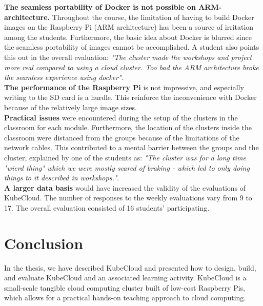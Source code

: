 \noindent
\textbf{The seamless portability of Docker is not possible on ARM-architecture.} Throughout the course, the limitation of having to build Docker images on the Raspberry Pi (ARM architecture) has been a source of irritation among the students. Furthermore, the basic idea about Docker is blurred since the seamless portability of images cannot be accomplished. A student also points this out in the overall evaluation: \textit{"The cluster made the workshops and project more real compared to using a cloud cluster. Too bad the ARM architecture broke the seamless experience using docker"}.\\

\noindent
\textbf{The performance of the Raspberry Pi} is not impressive, and especially writing to the SD card is a hurdle. This reinforce the inconvenience with Docker because of the relatively large image sizes.\\

\noindent
\textbf{Practical issues} were encountered during the setup of the clusters in the classroom for each module. Furthermore, the location of the clusters inside the classroom were distanced from the groups because of the limitations of the network cables. This contributed to a mental barrier between the groups and the cluster, explained by one of the students as: \textit{"The cluster was for a long time "wierd thing" which we were mostly scared of braking - which led to only doing things to it described in workshops."}. \\

\noindent
\textbf{A larger data basis} would have increased the validity of the evaluations of KubeCloud. The number of responses to the weekly evaluations vary from 9 to 17. The overall evaluation consisted of 16 students' participating.


\section{Conclusion}
In the thesis, we have described KubeCloud and presented how to design, build, and evaluate KubeCloud and an associated learning activity. KubeCloud is a small-scale tangible cloud computing cluster built of low-cost Raspberry Pis, which allows for a practical hands-on teaching approach to cloud computing.\\

